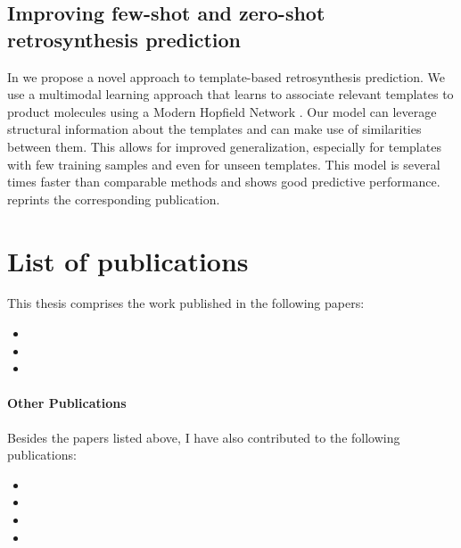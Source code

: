 \subsection{Improving few-shot and zero-shot retrosynthesis prediction}
In \citep{seidlImprovingFewZeroShot2022} we propose a novel approach to template-based
retrosynthesis prediction. We use a multimodal learning approach that learns to associate relevant
templates to product molecules using a Modern Hopfield Network
\citep{ramsauerHopfieldNetworksAll2020}. Our model can leverage structural information about the
templates and can make use of similarities between them. This allows for improved generalization,
especially for templates with few training samples and even for unseen templates. This model is
several times faster than comparable methods and shows good predictive performance.
 reprints the corresponding publication.

\section{List of publications\label{sec:publications}} This thesis comprises the work published in
the following papers:

\begin{itemize}
      \item {}
      \item {}
      \item {}
\end{itemize}

\paragraph{Other Publications} Besides the papers listed above, I have also contributed to the
following publications:

\begin{itemize}
      \item {}
      \item {}
      \item {}
      \item {}
\end{itemize}